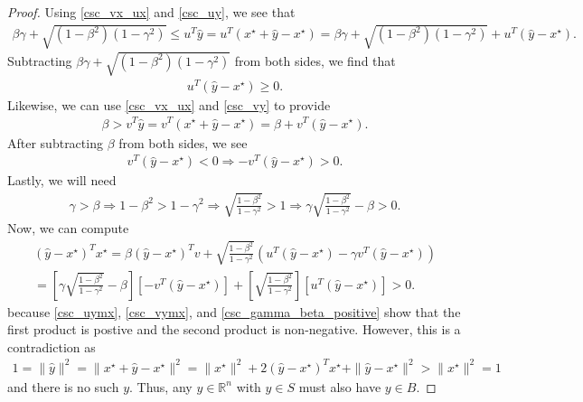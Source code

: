 \documentclass{article}
\theoremstyle{case}
\numberwithin{theorem}{subsection}
\newcommand{\Rn}{\mathbb R^n}
\begin{document}
\begin{proof}
Using \cref{csc_vx_ux} and \cref{csc_uy}, we see that
\begin{align*}
\beta\gamma + \sqrt{\left(1 - \beta^2\right)\left(1 - \gamma^2\right)} \le {u}^T\hat y = {u}^T\left(x^{\star} + \hat y - x^{\star}\right) 
= \beta \gamma + \sqrt{(1 - \beta^2)\left(1 - \gamma^2\right)} + {u}^T\left(\hat y - x^{\star}\right).
\end{align*}
Subtracting $\beta\gamma + \sqrt{\left(1 - \beta^2\right)\left(1 - \gamma^2\right)}$ from both sides, we find that
\begin{align}
{u}^T\left(\hat y - x^{\star}\right) \ge 0 \label{csc_uymx}.
\end{align}
Likewise, we can use \cref{csc_vx_ux} and \cref{csc_vy} to provide
\begin{align*}
\beta > {v}^T\hat y = {v}^T\left(x^{\star} + \hat y - x^{\star}\right) = \beta + {v}^T\left(\hat y - x^{\star}\right).
\end{align*}
After subtracting $\beta$ from both sides, we see
\begin{align}
{v}^T\left(\hat y - x^{\star}\right) < 0 \Longrightarrow -{v}^T\left(\hat y - x^{\star}\right) > 0. \label{csc_vymx}
\end{align}
Lastly, we will need
\begin{align}
\gamma > \beta 
\Longrightarrow 1 - \beta^2 > 1 - \gamma^2
\Longrightarrow \sqrt{\frac{1 - \beta^2}{1 - \gamma^2}} > 1
\Longrightarrow \gamma \sqrt{\frac{1 - \beta^2}{1 - \gamma^2}} - \beta > 0. \label{csc_gamma_beta_positive}
\end{align}
Now, we can compute
\begin{align*}
{\left(\hat y - x^{\star}\right)}^Tx^{\star} = 
\beta {\left(\hat y - x^{\star}\right)}^Tv
+ \sqrt{\frac{1 - \beta^2}{1 - \gamma^2}} 
\left(u^T\left(\hat y - x^{\star}\right) - \gamma v^T \left(\hat y - x^{\star}\right) \right)\\ 
= \left[\gamma \sqrt{\frac{1 - \beta^2}{1 - \gamma^2}} - \beta\right] \left[-v^T\left(\hat y - x^{\star}\right)\right]
+ \left[\sqrt{\frac{1 - \beta^2}{1 - \gamma^2}}\right] \left[u^T\left(\hat y - x^{\star}\right) \right] > 0.
\end{align*}
because \cref{csc_uymx}, \cref{csc_vymx}, and \cref{csc_gamma_beta_positive} show that the first product is postive and the second product is non-negative.
However, this is a contradiction as
\begin{align*}
1 = \|\hat y\|^2 = \|x^{\star} + \hat y - x^{\star}\|^2 = \|x^{\star}\|^2 + 2{\left(\hat y - x^{\star}\right)}^Tx^{\star} + \|\hat y - x^{\star}\|^2 > \|x^{\star}\|^2 = 1
\end{align*}
and there is no such $y$.
Thus, any $y \in\Rn$ with $y \in S$ must also have $y \in B$.
\end{proof}
\end{document}
